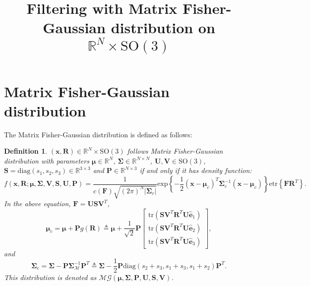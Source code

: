\documentclass[12pt]{article}
\title{\vspace{-4ex}\textbf{Filtering with Matrix Fisher-Gaussian distribution on $\mathbb{R}^N\times\mathrm{SO}(3)$\vspace{-4ex}}}
\date{}
\newtheorem{definition}{Definition}
\begin{document}
\maketitle

\section{Matrix Fisher-Gaussian distribution}
The Matrix Fisher-Gaussian distribution is defined as follows:
\begin{definition}
	$(\bm{x},\mathbf{R})\in\mathbb{R}^N\times\mathrm{SO}(3)$ follows Matrix Fisher-Gaussian distribution with parameters $\bm{\mu}\in\mathbb{R}^N$, $\mathbf{\Sigma}\in\mathbb{R}^{N\times N}$, $\mathbf{U},\mathbf{V}\in\mathrm{SO}(3)$, $\mathbf{S}=\mathrm{diag}(s_1,s_2,s_3)\in\mathbb{R}^{3\times 3}$ and $\mathbf{P}\in\mathbb{R}^{N\times 3}$ if and only if it has density function:
	\begin{equation} \label{eqn:MFG}
		f(\bm{x},\mathbf{R};\bm{\mu},\mathbf{\Sigma},\mathbf{V},\mathbf{S},\mathbf{U},\mathbf{P}) = \frac{1}{c(\mathbf{F})\sqrt{(2\pi)^N|\mathbf{\Sigma}_c|}} \mathrm{exp}\left\{-\frac{1}{2}(\bm{x}-\bm{\mu}_c)^T\mathbf{\Sigma}_c^{-1}(\bm{x}-\bm{\mu}_c)\right\} \mathrm{etr}\left\{\mathbf{F}\mathbf{R}^T\right\}.
	\end{equation}
	In the above equation, $\mathbf{F}=\mathbf{U}\mathbf{S}\mathbf{V}^T$,
	\begin{equation}
		\bm{\mu}_c = \bm{\mu}+\mathbf{P}g(\mathbf{R}) \triangleq \bm{\mu}+\frac{1}{\sqrt{2}}\mathbf{P}\begin{bmatrix}
			\mathrm{tr}(\mathbf{S}\mathbf{V}^T\mathbf{R}^T\mathbf{U}\hat{\bm{e}}_1) \\
			\mathrm{tr}(\mathbf{S}\mathbf{V}^T\mathbf{R}^T\mathbf{U}\hat{\bm{e}}_2) \\
			\mathrm{tr}(\mathbf{S}\mathbf{V}^T\mathbf{R}^T\mathbf{U}\hat{\bm{e}}_3)
		\end{bmatrix},
	\end{equation}
	and
	\begin{equation}
		\mathbf{\Sigma}_c = \mathbf{\Sigma}-\mathbf{P}\mathbf{\Sigma}_\mathcal{M}^{-1}\mathbf{P}^T \triangleq \mathbf{\Sigma}-\frac{1}{2}\mathbf{P}\mathrm{diag}(s_2+s_3,s_1+s_3,s_1+s_2)\mathbf{P}^T.
	\end{equation}
	This distribution is denoted as $\mathcal{MG}(\bm{\mu},\mathbf{\Sigma},\mathbf{P},\mathbf{U},\mathbf{S},\mathbf{V})$.
\end{definition}
\end{document}
